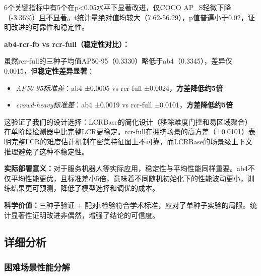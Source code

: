 \documentclass[journal]{IEEEtran}
\begin{document}
6个关键指标中有5个在p<0.05水平下显著改进，仅COCO AP\_S轻微下降（-3.36\%）且不显著。t统计量绝对值均较大（7.62-56.29），p值普遍小于0.02，证明改进的可靠性和稳定性。

\textbf{ab4-rcr-fb vs rcr-full（稳定性对比）：}

虽然rcr-full的三种子均值AP50-95（0.3330）略低于ab4（0.3345），差异仅0.0015，但\textbf{稳定性差异显著}：

\begin{itemize}
    \item \textit{AP50-95标准差}：ab4 ±0.0005 vs rcr-full ±0.0024，\textbf{方差降低约5倍}
    \item \textit{crowd-heavy标准差}：ab4 ±0.0019 vs rcr-full ±0.0101，\textbf{方差降低约5倍}
\end{itemize}

这验证了我们的设计选择：LCRBase的简化设计（移除难度门控和易区域聚合）在单阶段检测器中比完整LCR更稳定。rcr-full在拥挤场景的高方差（±0.0101）表明完整LCR的难度估计机制在密集特征图上不可靠，而LCRBase的场景级上下文推理避免了这种不稳定性。

\textbf{实际部署意义：}对于服务机器人等实际应用，稳定性与平均性能同样重要。ab4不仅平均性能更优，且标准差小5倍，意味着不同随机初始化下的性能波动更小，训练结果更可预测，降低了模型选择和调优的成本。

\textbf{科学价值：}三种子验证 + 配对t检验符合学术标准，应对了单种子实验的局限。统计显著性证明改进非偶然，增强了结论的可信度。




\subsection{详细分析}
\label{subsec:detailed_analysis}

\subsubsection{困难场景性能分解}
\end{document}
